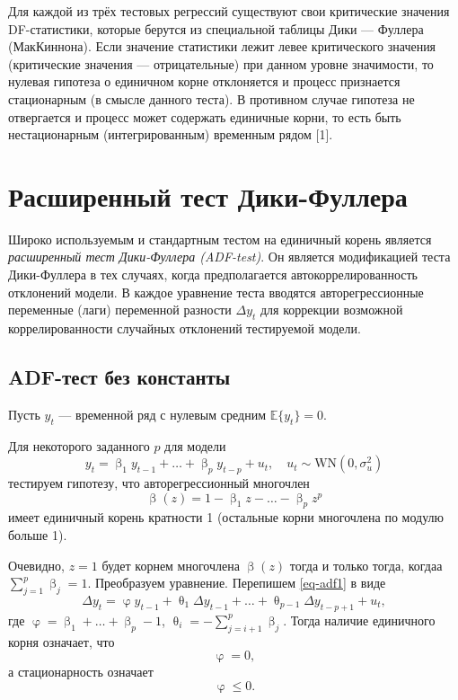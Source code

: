 \documentclass[a4paper, 14pt]{extreport}
\numberwithin{equation}{subsection}
\renewcommand{\leq}{\leqslant}
\renewcommand{\beta}{\upbeta}
\renewcommand{\varphi}{\upvarphi}
\renewcommand{\theta}{\uptheta}
\newcommand{\E}{\mathbb E}
\numberwithin{equation}{section}
\begin{document}
	Для каждой из трёх тестовых регрессий существуют свои критические значения DF-статистики, которые берутся из специальной таблицы Дики — Фуллера (МакКиннона). Если значение статистики лежит левее критического значения (критические значения — отрицательные) при данном уровне значимости, то нулевая гипотеза о единичном корне отклоняется и процесс признается стационарным (в смысле данного теста). В противном случае гипотеза не отвергается и процесс может содержать единичные корни, то есть быть нестационарным (интегрированным) временным рядом [1].
	
	
	\section{Расширенный тест Дики-Фуллера}
	\label{sbs:adf}
	
	Широко используемым и стандартным тестом на единичный корень является \textit{расширенный тест Дики-Фуллера (ADF-test)}. Он является модификацией теста Дики-Фуллера в тех случаях, когда
	предполагается автокоррелированность отклонений модели. В каждое уравнение
	теста вводятся авторегрессионные переменные (лаги) переменной разности
	$\Delta y_t$
	для коррекции возможной коррелированности случайных отклонений
	тестируемой модели.
	\subsection{ADF-тест без константы}
	Пусть $y_t$ --- временной ряд с нулевым средним $\E \{y_t\}=0$.
	
	Для некоторого заданного $p$ для модели
	\begin{equation}y_t=\beta_1y_{t-1}+\dots+\beta_p y_{t-p}+u_t,\quad u_t\sim \text{WN}(0,\sigma_u^2)
		\label{eq-adf1}
	\end{equation}
	тестируем гипотезу, что авторегрессионный многочлен
	\begin{equation}
		\beta(z)=1-\beta_1 z-\dots-\beta_p z^p
	\end{equation}
	имеет {единичный корень кратности 1} (остальные корни многочлена по модулю больше 1).
	
	Очевидно, $z=1$ будет корнем многочлена $\beta(z)$ тогда и только тогда, когдаа $\sum\limits_{j=1}^p\beta_j=1$. Преобразуем уравнение.
	Перепишем \eqref{eq-adf1} в виде
	\begin{equation}
		\Delta y_t=\varphi y_{t-1}+\theta_1\Delta y_{t-1}+\dots+\theta_{p-1}\Delta y_{t-p+1}+u_t,
		\label{eq-adf2}
	\end{equation}
	где $\varphi=\beta_1+\dots+\beta_p-1$, $\theta_i=-\sum\limits_{j=i+1}^p\beta_j$. Тогда наличие единичного корня означает, что $$\varphi=0,$$ а стационарность означает $$\varphi\leq 0.$$
	
\end{document}
